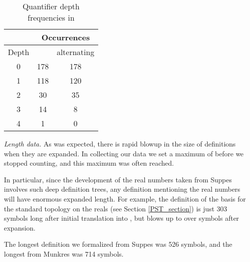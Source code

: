\documentclass{llncs}
\begin{document}
\begin{table}
\label{PSTdepths}
\begin{center}
\caption{Quantifier depth frequencies in }
\begin{tabular}{|c|c|c|}
\hline
 & \multicolumn{2}{|c|}{Occurrences} \\\hline
Depth &  &  alternating \\\hline
0 & 178 & 178 \\
1 & 118 & 120 \\
2 & 30  & 35  \\
3 & 14  & 8   \\
4 & 1   & 0   \\
\hline
\end{tabular}
\end{center}
\end{table}

\noindent \emph{Length data.} As was expected, there is rapid blowup
in the size of definitions when they are expanded. In collecting our
data we set a maximum of  before we stopped counting, and
this maximum was often reached.

In particular, since the development of the real numbers taken from
Suppes \cite{suppes} involves such deep definition trees, any
definition mentioning the real numbers will have enormous expanded
length. For example, the definition of the basis for the standard
topology on the reals (see Section \ref{PST_section}) is just 303
symbols long after initial translation into , but blows up
to over  symbols after expansion.

The longest definition we formalized from Suppes \cite{suppes} was 526
symbols, and the longest from Munkres \cite{munkres} was 714 symbols.
\end{document}
